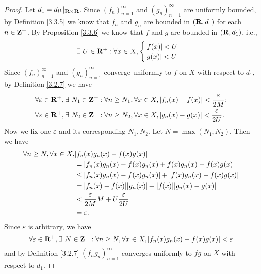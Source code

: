 \begin{proof}
    Let \(d_1 = d_{l^1}|_{\mathbf{R} \times \mathbf{R}}\).
    Since \((f_n)_{n = 1}^\infty\) and \((g_n)_{n = 1}^\infty\) are uniformly bounded, by Definition \ref{3.3.5} we know that \(f_n\) and \(g_n\) are bounded in \((\mathbf{R}, d_1)\) for each \(n \in \mathbf{Z}^+\).
    By Proposition \ref{3.3.6} we know that \(f\) and \(g\) are bounded in \((\mathbf{R}, d_1)\), i.e.,
    \[
        \exists\ U \in \mathbf{R}^+ : \forall x \in X, \begin{cases}
            \left\lvert f(x)\right\rvert < U \\
            \left\lvert g(x)\right\rvert < U
        \end{cases}
    \]
    Since \((f_n)_{n = 1}^\infty\) and \((g_n)_{n = 1}^\infty\) converge uniformly to \(f\) on \(X\) with respect to \(d_1\), by Definition \ref{3.2.7} we have
    \begin{align*}
         & \forall \varepsilon \in \mathbf{R}^+, \exists\ N_1 \in \mathbf{Z}^+ : \forall n \geq N_1, \forall x \in X, \left\lvert f_n(x) - f(x)\right\rvert < \frac{\varepsilon}{2M}; \\
         & \forall \varepsilon \in \mathbf{R}^+, \exists\ N_2 \in \mathbf{Z}^+ : \forall n \geq N_2, \forall x \in X, \left\lvert g_n(x) - g(x)\right\rvert < \frac{\varepsilon}{2U}.
    \end{align*}
    Now we fix one \(\varepsilon\) and its corresponding \(N_1, N_2\).
    Let \(N = \max(N_1, N_2)\).
    Then we have
    \begin{align*}
        \forall n \geq N, \forall x \in X, & \abs{f_n(x) g_n(x) - f(x) g(x)}                                        \\
                                           & = \abs{f_n(x) g_n(x) - f(x) g_n(x) + f(x) g_n(x) - f(x) g(x)}          \\
                                           & \leq \abs{f_n(x) g_n(x) - f(x) g_n(x)} + \abs{f(x) g_n(x) - f(x) g(x)} \\
                                           & = \abs{f_n(x) - f(x)} \abs{g_n(x)} + \abs{f(x)} \abs{g_n(x) - g(x)}    \\
                                           & < \frac{\varepsilon}{2M} M + U \frac{\varepsilon}{2U}                  \\
                                           & = \varepsilon.
    \end{align*}
    Since \(\varepsilon\) is arbitrary, we have
    \[
        \forall \varepsilon \in \mathbf{R}^+, \exists\ N \in \mathbf{Z}^+ : \forall n \geq N, \forall x \in X, \left\lvert f_n(x) g_n(x) - f(x) g(x)\right\rvert < \varepsilon
    \]
    and by Definition \ref{3.2.7} \((f_n g_n)_{n = 1}^\infty\) converges uniformly to \(fg\) on \(X\) with respect to \(d_1\).
\end{proof}